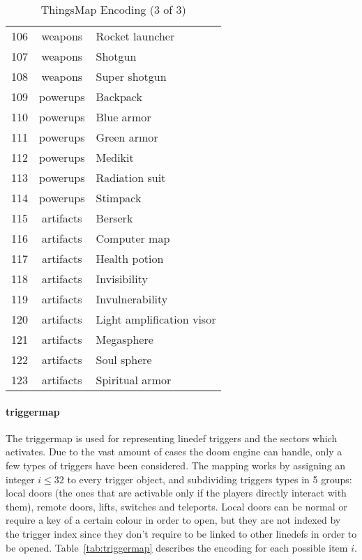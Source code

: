\begin{table}[b]
\begin{tabularx}{\textwidth}{| c | c | X | }
		106	& weapons	& Rocket launcher \\
		107	& weapons	& Shotgun \\
		108	& weapons	& Super shotgun \\
		109	& powerups	& Backpack \\
		110	& powerups	& Blue armor \\
		111	& powerups	& Green armor \\
		112	& powerups	& Medikit \\
		113	& powerups	& Radiation suit \\
		114	& powerups	& Stimpack \\
		115	& artifacts	& Berserk \\
		116	& artifacts	& Computer map \\
		117	& artifacts	& Health potion \\
		118	& artifacts	& Invisibility \\
		119	& artifacts	& Invulnerability \\
		120	& artifacts	& Light amplification visor \\
		121	& artifacts	& Megasphere \\
		122	& artifacts	& Soul sphere \\
		123	& artifacts	& Spiritual armor  \\
		\hline
	\end{tabularx}
	\caption{ThingsMap Encoding (3 of 3)}
	\label{tab:thingsmap3}
\end{table}

\paragraph{\gls{triggermap}} The \gls{triggermap} is used for representing linedef triggers and the sectors which activates. Due to the vast amount of cases the doom engine can handle, only a few types of triggers have been considered. The mapping works by assigning an integer $ i \le 32 $ to every trigger object, and subdividing triggers types in 5 groups: local doors (the ones that are activable only if the players directly interact with them), remote doors, lifts, switches and teleports. Local doors can be normal or require a key of a certain colour in order to open, but they are not indexed by the trigger index since they don't require to be linked to other linedefs in order to be opened. Table~\ref{tab:triggermap} describes the encoding for each possible item $ i $.

